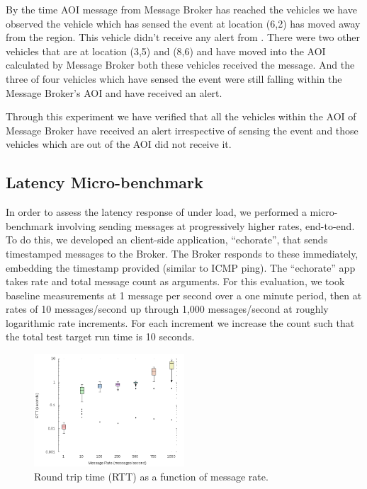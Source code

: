 By the time AOI message from Message Broker has reached the vehicles
we have observed the vehicle which has sensed the event at location
(6,2) has moved away from the region. This vehicle didn't receive any
alert from \name.  There were two other vehicles that are at
location (3,5) and (8,6) and have moved into the AOI calculated by
Message Broker both these vehicles received the message. And the three
of four vehicles which have sensed the event were still falling within
the Message Broker's AOI and have received an alert.
   
Through this experiment we have verified that all the vehicles within the
AOI of Message Broker have received an alert irrespective of sensing
the event and those vehicles which are out of the AOI did not receive it.

\subsection{Latency Micro-benchmark}

In order to assess the latency response of \name{} under load, we
performed a micro-benchmark involving sending messages at
progressively higher rates, end-to-end. To do this, we developed an
client-side application, ``echorate'', that sends timestamped messages
to the Broker. The Broker responds to these immediately, embedding the
timestamp provided (similar to ICMP ping). The ``echorate'' app takes
rate and total message count as arguments. For this evaluation, we
took baseline measurements at 1 message per second over a one minute
period, then at rates of 10 messages/second up through 1,000
messages/second at roughly logarithmic rate increments. For each increment
we increase the count such that the total test target run time is
10 seconds.

\begin{figure}[ht]
  \begin{center}
    \includegraphics[width=0.5\textwidth]{figs/RTT.png}
    \caption{Round trip time (RTT) as a function of message rate.}
    \label{fig:RTT}
  \end{center}
\end{figure}

